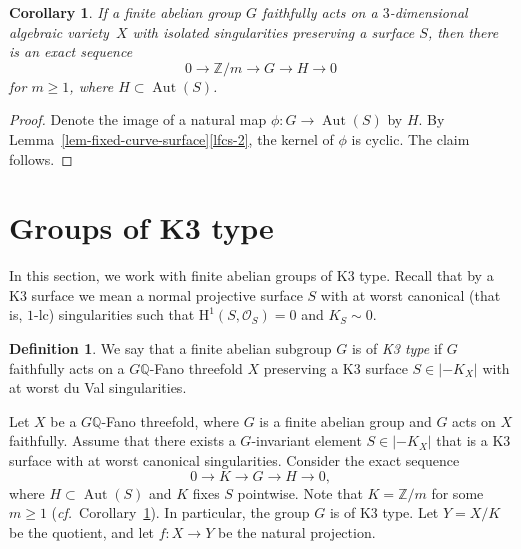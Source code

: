 \documentclass[10pt,a4paper]{article}
\newtheorem{corollary}[thm]{Corollary}
\theoremstyle{definition}
\newtheorem{defin}[thm]{Definition}
\theoremstyle{remark}
\newcommand{\OOO}{\mathscr{O}}
\newcommand{\lra}{\longrightarrow}
\DeclareMathOperator{\Aut}{Aut}
\begin{document}
\begin{corollary}
\label{cor-G-preserves-K3-type}
If a finite abelian group $G$ faithfully acts on a $3$-dimensional algebraic variety~$X$ with isolated singularities preserving a surface $S$, then there is an exact sequence
\[
0\lra \mathbb{Z}/m \lra G \lra H \lra 0
\]
for $m\geq 1$, where $H\subset \Aut(S)$. 
\end{corollary}

\begin{proof}
Denote the image of a natural map $\phi\colon G\to \Aut(S)$ by $H$. By Lemma~\ref{lem-fixed-curve-surface}\eqref{lfcs-2}, the kernel of $\phi$ is cyclic. The claim follows. 
\end{proof}

\setcounter{section}{10}\setcounter{thm}{0}

\section{Groups of K3 type}
\label{sect-action-on-K3}
In this section, we work with finite abelian groups of K3 type. Recall that by a K3 surface we mean a normal projective surface
$S$ with at worst canonical (that is, $1$-lc) singularities such that
$\mathrm{H}^1(S, \OOO_S)=0$ and $K_S\sim 0$. 

\begin{defin}
We say that a finite abelian subgroup $G$ is of \emph{K3 type} if $G$ faithfully acts on a $G\mathbb{Q}$-Fano threefold $X$ preserving a K3 surface $S\in|-K_X|$ with at worst du Val singularities.
\end{defin}

  
Let $X$ be a $G\mathbb{Q}$-Fano threefold, where $G$ is a finite abelian group and $G$ acts on $X$ faithfully. Assume that there exists a $G$-invariant element $S\in |-K_X|$ that is a K3 surface with at worst canonical singularities. Consider the  exact sequence
\[
0\lra K \lra G\lra H\lra 0, 
\]
where $H\subset \Aut(S)$ and $K$ fixes $S$ pointwise.  Note that $K=\mathbb{Z}/m$ for some $m\geq 1$ (\textit{cf.}~Corollary~\ref{cor-G-preserves-K3-type}).  In particular, the group $G$ is of K3 type.  Let $Y=X/K$ be the quotient, and let $f\colon X\to Y$ be the natural projection.
\end{document}
